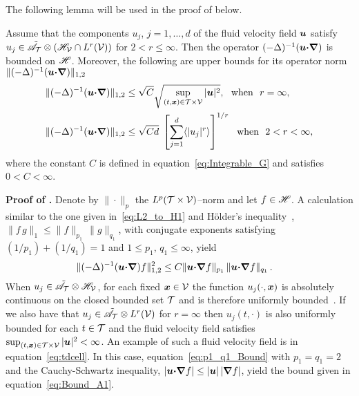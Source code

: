 \documentclass[amsa]{ipart}
\begin{document}
The following lemma will be used in the
proof of  below.
%
\begin{lemma}\label{lem:A_bounded}
%
Assume that the components $u_j$, $j=1,\ldots,d$ of the fluid velocity
field $\boldsymbol{u}$ satisfy $u_j\in\tilde{\mathscr{A}}_{\mathcal{T}}\otimes(\mathscr{H}_{\mathcal{V}}\cap
L^r(\mathcal{V}))$ for $2<r\leq\infty$. Then the operator
$(-\Delta)^{-1}(\boldsymbol{u}\mbox{\boldmath${\cdot}$}\mbox{\boldmath${\nabla}$})$ is bounded on $\mathscr{H}$. Moreover, the
following are upper bounds for its operator norm
$\|(-\Delta)^{-1}(\boldsymbol{u}\mbox{\boldmath${\cdot}$}\mbox{\boldmath${\nabla}$})\|_{1,2}$ 
%
\begin{align}
  \|(-\Delta)^{-1}(\vecu\bcdot\bnabla)\|_{1,2}
  &\leq\sqrt{C}\sqrt{\sup_{(t,\vecx)\in\Tc\times\Vc}|\vecu|^2},
  ~\text{ when }~ r=\infty,
  \label{eq:Bound_A1}  
  \\
  \|(-\Delta)^{-1}(\vecu\bcdot\bnabla)\|_{1,2}
  &\leq\sqrt{Cd}\;\left[\sum_{j=1}^d\langle|u_j|^r\rangle\right]^{1/r}
  ~\text{ when }~ 2<r<\infty,
  \label{eq:Bound_A2}
\end{align}
%
where the constant $C$ is defined in equation~\eqref{eq:Integrable_G}
and satisfies $0<C<\infty$. 
%
\end{lemma}
%



\textbf{Proof of .}\hspace{1ex}
%
Denote by $\|\cdot\|_p$ the $L^p(\mathcal{T}\times\mathcal{V})$--norm and let $f\in\mathscr{H}$. A
calculation similar to the one given 
in~\eqref{eq:L2_to_H1} and H{\"o}lder's
inequality~\cite{Folland:99:RealAnalysis}, 
$\|f\,g\|_1\leq\|f\|_{p_1}\,\|g\|_{q_1}$, with conjugate exponents
satisfying $(1/p_1)+(1/q_1)=1$ and $1\leq p_1,\,q_1\leq\infty$, yield
%
\begin{align}\label{eq:p1_q1_Bound}
  \|(-\Delta)^{-1}(\vecu\bcdot\bnabla)f\|^2_{1,2}
  &\leq C\|\vecu\bcdot\bnabla f\|_{p_1}\,\|\vecu\bcdot\bnabla f\|_{q_1}\,.
\end{align}
%
When $u_j\in\tilde{\mathscr{A}}_{\mathcal{T}}\otimes\mathscr{H}_{\mathcal{V}}$, for each fixed
$\boldsymbol{x}\in\mathcal{V}$ the function $u_j(\cdot,\boldsymbol{x})$ is absolutely continuous  on
the closed bounded set $\mathcal{T}$ and is therefore uniformly
bounded~\cite{Royden:1988:RA,BabyRudin:64}. If we 
also have that $u_j\in\tilde{\mathscr{A}}_{\mathcal{T}}\otimes L^r(\mathcal{V})$ for $r=\infty$ then
$u_j(t,\cdot)$ is also uniformly bounded for each $t\in\mathcal{T}$ and the fluid
velocity field satisfies $\sup_{(t,\boldsymbol{x})\in\mathcal{T}\times\mathcal{V}}|\boldsymbol{u}|^2<\infty$. An
example of such a fluid velocity field is in
equation~\eqref{eq:tdcell}. In this case,
equation~\eqref{eq:p1_q1_Bound} with 
$p_1=q_1=2$ and the Cauchy-Schwartz inequality,
$|\boldsymbol{u}\mbox{\boldmath${\cdot}$}\mbox{\boldmath${\nabla}$} f|\leq|\boldsymbol{u}|\,|\mbox{\boldmath${\nabla}$} f|$, yield the bound given in 
equation~\eqref{eq:Bound_A1}.
\end{document}
